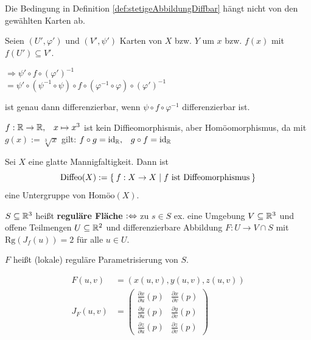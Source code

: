 \begin{korollar}
    Die Bedingung in Definition \ref{def:stetigeAbbildungDiffbar} hängt nicht
    von den gewählten Karten ab.
\end{korollar}

\begin{beweis}
    Seien $(U', \varphi')$ und $(V', \psi')$ Karten von $X$ bzw. $Y$
    um $x$ bzw. $f(x)$ mit $f(U') \subseteq V'$.
    
    $\Rightarrow \psi' \circ f \circ (\varphi')^{-1}$\\
    $= \psi' \circ ( \psi^{-1} \circ \psi) \circ f \circ (\varphi^{-1} \circ \varphi ) \circ (\varphi')^{-1}$

    ist genau dann differenzierbar, wenn $\psi \circ f \circ \varphi^{-1}$
    differenzierbar ist.
\end{beweis}

\begin{beispiel}
    $f: \mathbb{R} \rightarrow \mathbb{R}, \;\;\; x \mapsto x^3$ ist kein
    Diffieomorphismis, aber Homöomorphismus, da mit $g(x) := \sqrt[3]{x}$
    gilt: $f \circ g = \text{id}_{\mathbb{R}}, \;\;\; g \circ f = \text{id}_\text{\ensuremath{\mathbb{R}}}$
\end{beispiel}

\begin{bemerkung}
    Sei $X$ eine glatte Mannigfaltigkeit. Dann ist
    \[\text{Diffeo}(X) := \Set{f:X \rightarrow X | f \text{ ist Diffeomorphismus}}\]
    eine Untergruppe von $\text{Homöo}(X)$.
\end{bemerkung}

\begin{definition}
    $S \subseteq \mathbb{R}^3$ heißt \textbf{reguläre Fläche} $:\Leftrightarrow$
    zu $s \in S$ ex. eine Umgebung $V \subseteq \mathbb{R}^3$ und offene
    Teilmengen $U \subseteq \mathbb{R}^2$ und differenzierbare Abbildung
    $F: U \rightarrow V \cap S$ mit $\text{Rg}(J_f(u)) = 2$
    für alle $u \in U$.

    $F$ heißt (lokale) reguläre Parametrisierung von $S$.

    \begin{align*}
        F(u,v) &= \left (x(u,v), y(u,v), z(u,v) \right )\\
        J_F(u,v) &= \begin{pmatrix}
            \frac{\partial x}{\partial u} (p) & \frac{\partial x}{\partial v} (p)\\
            \frac{\partial y}{\partial u} (p) & \frac{\partial y}{\partial v} (p)\\
            \frac{\partial z}{\partial u} (p) & \frac{\partial z}{\partial v} (p)
        \end{pmatrix}
    \end{align*}
\end{definition}

